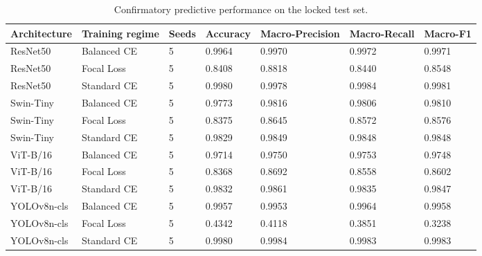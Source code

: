 \begin{table}
\caption{Confirmatory predictive performance on the locked test set.}
\label{tab:predictive-performance}
\begin{tabular}{lllllll}
\toprule
Architecture & Training regime & Seeds & Accuracy & Macro-Precision & Macro-Recall & Macro-F1 \\
\midrule
ResNet50 & Balanced CE & 5 & 0.9964 & 0.9970 & 0.9972 & 0.9971 \\
ResNet50 & Focal Loss & 5 & 0.8408 & 0.8818 & 0.8440 & 0.8548 \\
ResNet50 & Standard CE & 5 & 0.9980 & 0.9978 & 0.9984 & 0.9981 \\
Swin-Tiny & Balanced CE & 5 & 0.9773 & 0.9816 & 0.9806 & 0.9810 \\
Swin-Tiny & Focal Loss & 5 & 0.8375 & 0.8645 & 0.8572 & 0.8576 \\
Swin-Tiny & Standard CE & 5 & 0.9829 & 0.9849 & 0.9848 & 0.9848 \\
ViT-B/16 & Balanced CE & 5 & 0.9714 & 0.9750 & 0.9753 & 0.9748 \\
ViT-B/16 & Focal Loss & 5 & 0.8368 & 0.8692 & 0.8558 & 0.8602 \\
ViT-B/16 & Standard CE & 5 & 0.9832 & 0.9861 & 0.9835 & 0.9847 \\
YOLOv8n-cls & Balanced CE & 5 & 0.9957 & 0.9953 & 0.9964 & 0.9958 \\
YOLOv8n-cls & Focal Loss & 5 & 0.4342 & 0.4118 & 0.3851 & 0.3238 \\
YOLOv8n-cls & Standard CE & 5 & 0.9980 & 0.9984 & 0.9983 & 0.9983 \\
\bottomrule
\end{tabular}
\end{table}

